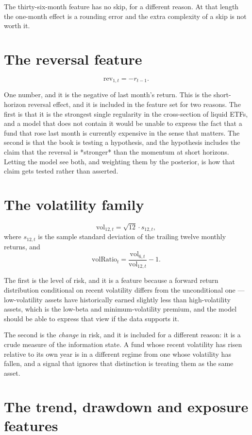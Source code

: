 The thirty-six-month feature has no skip, for a different reason. At that
length the one-month effect is a rounding error and the extra
complexity of a skip is not worth it.

\section{The reversal feature}

\[
\mathrm{rev}_{1,t} = -r_{t-1}.
\]

One number, and it is the negative of last month's return. This is the
short-horizon reversal effect, and it is included in the feature set for
two reasons. The first is that it is the strongest single regularity in
the cross-section of liquid ETFs, and a model that does not contain it
would be unable to express the fact that a fund that rose last month is
currently expensive in the sense that matters. The second is that the
book is testing a hypothesis, and the hypothesis includes the claim that
the reversal is *stronger* than the momentum at short horizons. Letting
the model see both, and weighting them by the posterior, is how that claim
gets tested rather than asserted.

\section{The volatility family}

\[
\mathrm{vol}_{12,t} = \sqrt{12}\cdot s_{12,t},
\]
where \(s_{12,t}\) is the sample standard deviation of the trailing
twelve monthly returns, and
\[
\mathrm{volRatio}_t = \frac{\mathrm{vol}_{6,t}}{\mathrm{vol}_{12,t}} - 1.
\]

The first is the level of risk, and it is a feature because a forward
return distribution conditional on recent volatility differs from the
unconditional one --- low-volatility assets have historically earned
slightly less than high-volatility assets, which is the low-beta and
minimum-volatility premium, and the model should be able to express that
view if the data supports it.

The second is the \emph{change} in risk, and it is included for a
different reason: it is a crude measure of the information state. A fund
whose recent volatility has risen relative to its own year is in a
different regime from one whose volatility has fallen, and a signal that
ignores that distinction is treating them as the same asset.

\section{The trend, drawdown and exposure features}

